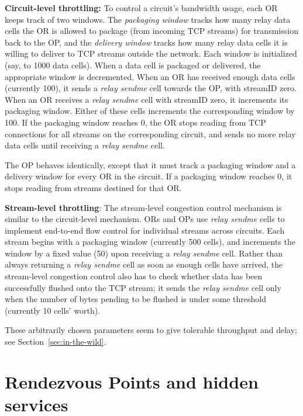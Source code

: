 \documentclass[twocolumn]{article}
\begin{document}
\textbf{Circuit-level throttling:}
To control a circuit's bandwidth usage, each OR keeps track of two
windows. The \emph{packaging window} tracks how many relay data cells the OR is
allowed to package (from incoming TCP streams) for transmission back to the OP,
and the \emph{delivery window} tracks how many relay data cells it is willing
to deliver to TCP streams outside the network. Each window is initialized
(say, to 1000 data cells). When a data cell is packaged or delivered,
the appropriate window is decremented. When an OR has received enough
data cells (currently 100), it sends a \emph{relay sendme} cell towards the OP,
with streamID zero. When an OR receives a \emph{relay sendme} cell with
streamID zero, it increments its packaging window. Either of these cells
increments the corresponding window by 100. If the packaging window
reaches 0, the OR stops reading from TCP connections for all streams
on the corresponding circuit, and sends no more relay data cells until
receiving a \emph{relay sendme} cell.

The OP behaves identically, except that it must track a packaging window
and a delivery window for every OR in the circuit. If a packaging window
reaches 0, it stops reading from streams destined for that OR.

\textbf{Stream-level throttling}:
The stream-level congestion control mechanism is similar to the
circuit-level mechanism. ORs and OPs use \emph{relay sendme} cells
to implement end-to-end flow control for individual streams across
circuits. Each stream begins with a packaging window (currently 500 cells),
and increments the window by a fixed value (50) upon receiving a \emph{relay
sendme} cell. Rather than always returning a \emph{relay sendme} cell as soon
as enough cells have arrived, the stream-level congestion control also
has to check whether data has been successfully flushed onto the TCP
stream; it sends the \emph{relay sendme} cell only when the number of bytes pending
to be flushed is under some threshold (currently 10 cells' worth).


These arbitrarily chosen parameters seem to give tolerable throughput
and delay; see Section~\ref{sec:in-the-wild}.

\section{Rendezvous Points and hidden services}
\label{sec:rendezvous}
\end{document}
